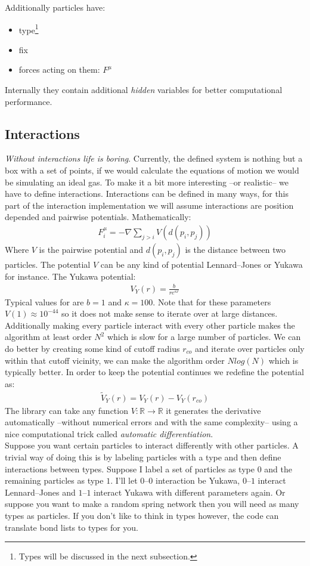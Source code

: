 \documentclass[11pt,a4paper,oneside]{report}
\newcommand{\subsect}[1]{\subsection{#1} \setcounter{equation}{0}}
\begin{document}
Additionally particles have:
\begin{itemize} \itemsep1pt \parskip0pt 
\item type\footnote{Types will be discussed in the next subsection.}
\item fix
\item forces acting on them: $F^{\mu}$
\end{itemize}
Internally they contain additional \emph{hidden} variables for better computational performance.
\subsect{Interactions} 
\emph{Without interactions life is boring}. Currently, the defined system is nothing but a box with a set of points, if we would calculate the equations of motion we would be simulating an ideal gas. To make it a bit more interesting --or realistic-- we have to define interactions. Interactions can be defined in many ways, for this part of the interaction implementation we will assume interactions are position depended and pairwise potentials. Mathematically:
\begin{align}
F^{\mu}_i=-\nabla \sum_{j>i} V(d(p_i,p_j))
\end{align}
Where $V$ is the pairwise potential and $d(p_i,p_j)$ is the distance between two particles. The potential $V$ can be any kind of potential Lennard--Jones or Yukawa for instance.
The Yukawa potential:
\begin{align}
V_Y(r)=\frac{b}{re^{\kappa r}}
\end{align}
Typical values for are $b=1$ and $\kappa=100$. Note that for these parameters $V(1) \approx 10^{-44}$  so it does not make sense to iterate over at large distances. Additionally making every particle interact with every other particle makes the algorithm at least order $N^2$ which is slow for a large number of particles. We can do better by creating some kind of cutoff radius $r_{co}$ and iterate over particles only within that cutoff vicinity, we can make the algorithm order $N log(N)$ which is typically better. In order to keep the potential continues we redefine the potential as:
\begin{align}
\tilde{V}_Y(r)=V_Y(r)-V_Y(r_{co})
\end{align}
The library can take any function $V: \mathds{R} \rightarrow \mathds{R}$ it generates the derivative automatically --without numerical errors and with the same complexity-- using a nice computational trick called \emph{automatic differentiation}.\\
Suppose you want certain particles to interact differently with other particles. A trivial way of doing this is by labeling particles with a type and then define interactions between types. Suppose I label a set of particles as type $0$ and the remaining particles as type $1$. I'll let $0$--$0$ interaction be Yukawa, $0$--$1$ interact Lennard--Jones and $1$--$1$ interact Yukawa with different parameters again. Or suppose you want to make a random spring network then you will need as many types as particles. If you don't like to think in types however, the code can translate bond lists to types for you.\\
\end{document}
